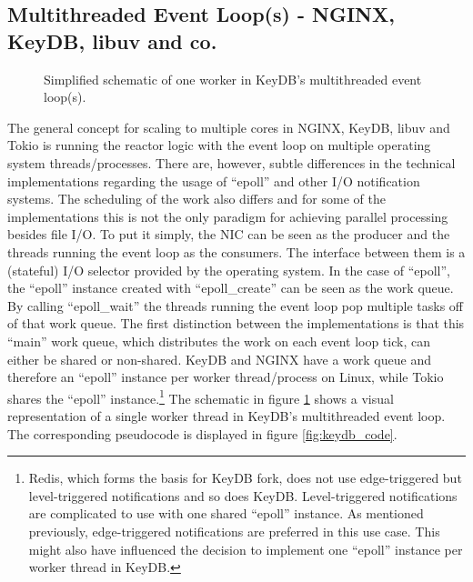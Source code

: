 \subsection{Multithreaded Event Loop(s) - NGINX, KeyDB, libuv and co.}
\begin{figure}
  \centering
  \caption{Simplified schematic of one worker in KeyDB's multithreaded event loop(s).}
  \label{fig:keydb_arch}
\end{figure}
The general concept for scaling to multiple cores in NGINX, KeyDB, libuv and Tokio is running the reactor logic with the event loop on multiple operating system threads/processes.  \newline
There are, however, subtle differences in the technical implementations regarding the usage of “epoll” and other I/O notification systems. The scheduling of the work also differs and for some of the implementations this is not the only paradigm for achieving parallel processing besides file I/O. \newline
To put it simply, the NIC can be seen as the producer and the threads running the event loop as the consumers. The interface between them is a (stateful) I/O selector provided by the operating system. In the case of “epoll”, the “epoll” instance created with “epoll\_create” can be seen as the work queue. By calling “epoll\_wait” the threads running the event loop pop  multiple tasks off of that work queue. The first distinction between the implementations is that this “main” work queue, which distributes the work on each event loop tick, can either be shared or non-shared. KeyDB and NGINX have a work queue and therefore an “epoll” instance per worker thread/process on Linux, while Tokio shares the “epoll” instance.\footnote{Redis, which forms the basis for KeyDB fork, does not use edge-triggered but level-triggered notifications and so does KeyDB. Level-triggered notifications are complicated to use with one shared “epoll” instance. As mentioned previously, edge-triggered notifications are preferred in this use case. This might also have influenced the decision to implement one “epoll” instance per worker thread in KeyDB.} The schematic in figure \ref{fig:keydb_arch} shows a visual representation of a single worker thread in KeyDB’s multithreaded event loop. The corresponding pseudocode is displayed in figure \ref{fig:keydb_code}.  \newline
